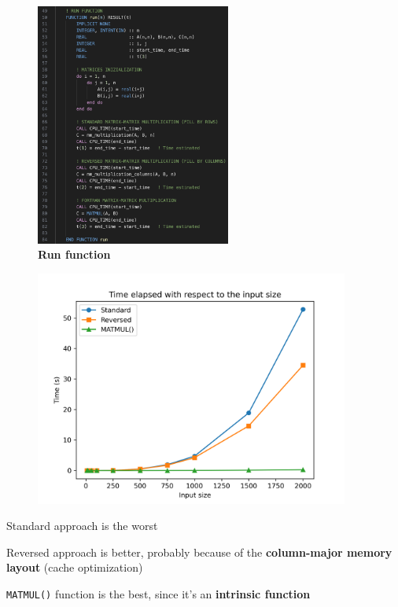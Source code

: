 \documentclass[10pt,externalviewer]{beamer}
\begin{document}
\begin{frame}
\begin{minipage}{0.45\textwidth}
      \begin{figure}[H]
         \centering
            \includegraphics[width=0.57\textwidth]{Immagini/run-function.png}
            \caption*{\tiny{\textbf{Run function}}}
      \end{figure}
   \end{minipage}
   \hfill
   \begin{minipage}{0.5\textwidth}
      \begin{figure}[H]
         \centering
            \includegraphics[width=0.92\textwidth]{Immagini/plot_t_sum.png}
      \end{figure}

      \vspace{-0.15cm}

      \begin{itemize}
         \small{\item Standard approach is the worst}
         \small{\item Reversed approach is better, probably because of the \textcolor{BrickRed}{\textbf{column-major memory layout}} (cache optimization)}
         \small{\item \texttt{MATMUL()} function is the best, since it's an \textcolor{BrickRed}{\textbf{intrinsic function}}} 
      \end{itemize}

      \vfill
   \end{minipage}
\end{frame}
\end{document}
